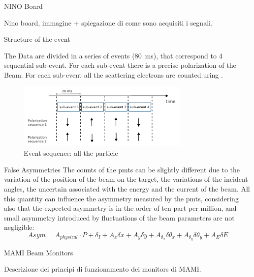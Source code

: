 \documentclass[8pt,a4paper]{beamer}
\begin{document}
\begin{frame}{NINO Board}

Nino board, immagine + spiegazione di come sono acquisiti i segnali.

\end{frame}

\begin{frame}{Structure of the event}

The Data are divided in a series of events (\SI{80}{\milli \second}), that correspond to 4 sequential sub-event. For each sub-event there is a precise polarization of the Beam. For each sub-event all the scattering electrons are counted.uring . 

\begin{figure}[hbtp]
\centering
\includegraphics[width = 0.75\textwidth]{figures/EventStructure.pdf}
\caption{Event sequence: all the particle}
\end{figure}

\end{frame}

\begin{frame}{False Asymmetries}
The counts of the pmts can be slightly different due to the variation of the position of the beam on the target, the variations of the incident angles, the uncertain associated with the energy and the current of the beam. All this quantity can influence the asymmetry measured by the pmts, considering also that the expected asymmetry is in the order of ten part per million, and small asymmetry introduced by fluctuations of the beam parameters are not negligible:
\newline
\newline
\begin{equation}
Asym = A_{physical} \cdot P + \delta_{I} + A_{x} \delta x + A_{y} \delta y + A_{\theta_{x}} \delta \theta_{x} + A_{\theta_{y}} \delta \theta_{y}+ A_{E} \delta E 
\end{equation}
\end{frame}


\begin{frame}{MAMI Beam Monitors}

Descrizione dei principi di funzionamento dei monitors di MAMI.

\end{frame}
\end{document}

